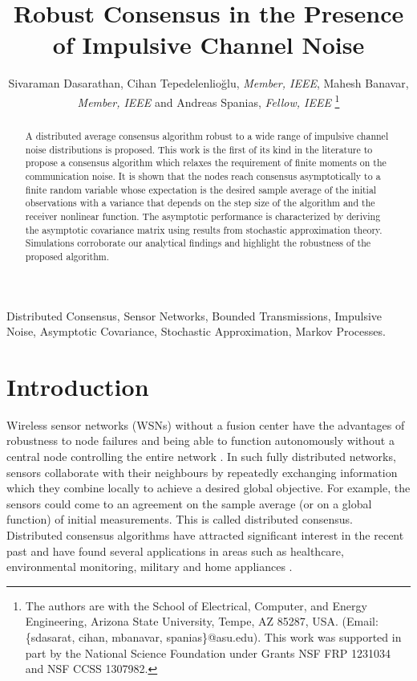 \documentclass[onecolumn, draft, 12pt]{IEEEtran}
\begin{document}
\title{Robust Consensus in the Presence of Impulsive Channel Noise}
\author{Sivaraman Dasarathan, Cihan Tepedelenlio\u{g}lu, \emph{Member, IEEE}, Mahesh Banavar, \emph{Member, IEEE} and Andreas Spanias, \emph{Fellow, IEEE}
\thanks{The authors are with the School of Electrical, Computer, and Energy Engineering, Arizona State University, Tempe, AZ 85287, USA. (Email: \{sdasarat, cihan, mbanavar, spanias\}@asu.edu). This work was supported in part by the National Science Foundation under Grants NSF FRP 1231034 and NSF CCSS 1307982.}
} \maketitle
 
\begin{abstract}
A distributed average consensus algorithm robust to a wide range of impulsive channel noise distributions is proposed. This work is the first of its kind in the literature to propose a consensus algorithm which relaxes the requirement of finite moments on the communication noise. It is shown that the nodes reach consensus asymptotically to a finite random variable whose expectation is the desired sample average of the initial observations with a variance that depends on the step size of the algorithm and the receiver nonlinear function. The asymptotic performance is characterized by deriving the asymptotic covariance matrix using results from stochastic approximation theory. Simulations corroborate our analytical findings and highlight the robustness of the proposed algorithm.
\end{abstract}
\begin{IEEEkeywords}
Distributed Consensus, Sensor Networks, Bounded Transmissions, Impulsive Noise, Asymptotic Covariance, Stochastic Approximation, Markov Processes.
\end{IEEEkeywords}

\section{Introduction} \label{sec:intro_btx_consensus_robust}
Wireless sensor networks (WSNs) without a fusion center have the advantages of robustness to node failures and being able to function autonomously without a central node controlling the entire network \cite{Sankarasubramaniam2002}. In such fully distributed networks, sensors collaborate with their neighbours by repeatedly exchanging information which they combine locally to achieve a desired global objective. For example, the sensors could come to an agreement on the sample average (or on a global function) of initial measurements. This is called distributed consensus. Distributed consensus algorithms have attracted significant interest in the recent past and have found several applications in areas such as healthcare, environmental monitoring, military and home appliances \cite{Boyd2003,Boyd2004,OlfatiSaber2003,OlfatiSaber2007,MinyiHuang2008,Oreshkin2008,KarMoura2009}. 
\end{document}
